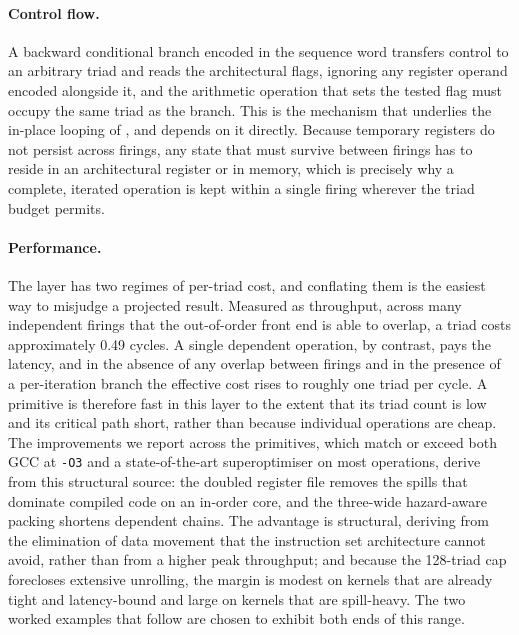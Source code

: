 \paragraph{Control flow.}
A backward conditional branch encoded in the sequence word transfers control to
an arbitrary triad and reads the architectural flags, ignoring any register
operand encoded alongside it, and the arithmetic operation that sets the tested
flag must occupy the same triad as the branch. This is the mechanism that
underlies the in-place looping of , and 
depends on it directly. Because temporary registers do not persist across
firings, any state that must survive between firings has to reside in an
architectural register or in memory, which is precisely why a complete, iterated
operation is kept within a single firing wherever the triad budget permits.

\paragraph{Performance.}
The layer has two regimes of per-triad cost, and conflating them is the easiest
way to misjudge a projected result. Measured as throughput, across many
independent firings that the out-of-order front end is able to overlap, a triad
costs approximately 0.49 cycles. A single dependent operation, by contrast, pays
the latency, and in the absence of any overlap between firings and in the
presence of a per-iteration branch the effective cost rises to roughly one triad
per cycle. A primitive is therefore fast in this layer to the extent that its
triad count is low and its critical path short, rather than because individual
operations are cheap. The improvements we report across the primitives, which
match or exceed both GCC at \texttt{-O3} and a state-of-the-art superoptimiser on
most operations, derive from this structural source: the doubled register file
removes the spills that dominate compiled code on an in-order core, and the
three-wide hazard-aware packing shortens dependent chains. The advantage is
structural, deriving from the elimination of data movement that the instruction
set architecture cannot avoid, rather than from a higher peak throughput; and
because the 128-triad cap forecloses extensive unrolling, the margin is modest on
kernels that are already tight and latency-bound and large on kernels that are
spill-heavy. The two worked examples that follow are chosen to exhibit both ends
of this range.
